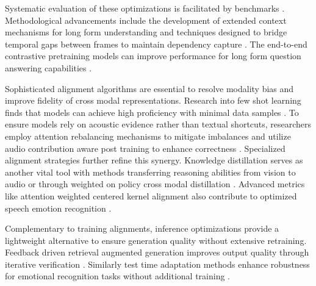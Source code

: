 Systematic evaluation of these optimizations is facilitated by benchmarks \cite{luo2026chronosaudio}. Methodological advancements include the development of extended context mechanisms for long form understanding \cite{chaichana2026extending} and techniques designed to bridge temporal gaps between frames to maintain dependency capture \cite{wang2026listening}. The end-to-end contrastive pretraining models can improve performance for long form question answering capabilities \cite{hu2026end}.

Sophisticated alignment algorithms are essential to resolve modality bias and improve fidelity of cross modal representations. Research into few shot learning finds that models can achieve high proficiency with minimal data samples \cite{zhang2025mimo}. To ensure models rely on acoustic evidence rather than textual shortcuts, researchers employ attention rebalancing mechanisms to mitigate imbalances \cite{wang2025pay} and utilize audio contribution aware post training to enhance correctness \cite{he2025measuring}. Specialized alignment strategies \cite{grinberg2026alarm} further refine this synergy. Knowledge distillation serves as another vital tool with methods transferring reasoning abilities from vision to audio \cite{wang2025sightsound} or through weighted on policy cross modal distillation \cite{hu2026cord}. Advanced metrics like attention weighted centered kernel alignment also contribute to optimized speech emotion recognition \cite{yang2026attention}.

Complementary to training alignments, inference optimizations provide a lightweight alternative to ensure generation quality without extensive retraining. Feedback driven retrieval augmented generation improves output quality through iterative verification \cite{zhao2025feedback}. Similarly test time adaptation methods enhance robustness for emotional recognition tasks without additional training \cite{shi2025emo}.

